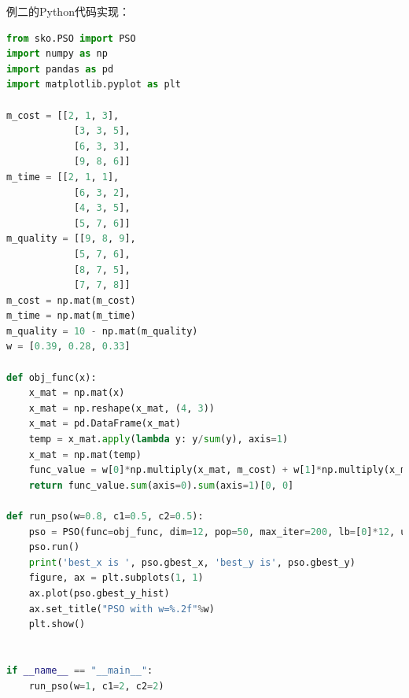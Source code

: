 \documentclass[lang=cn,12pt,a4paper,cite=authoryear]{elegantpaper}
\begin{document}
例二的Python代码实现：

\begin{lstlisting}[language=Python]
from sko.PSO import PSO
import numpy as np
import pandas as pd
import matplotlib.pyplot as plt

m_cost = [[2, 1, 3],
			[3, 3, 5],
			[6, 3, 3],
			[9, 8, 6]]
m_time = [[2, 1, 1],
			[6, 3, 2],
			[4, 3, 5],
			[5, 7, 6]]
m_quality = [[9, 8, 9],
			[5, 7, 6],
			[8, 7, 5],
			[7, 7, 8]]
m_cost = np.mat(m_cost)
m_time = np.mat(m_time)
m_quality = 10 - np.mat(m_quality)
w = [0.39, 0.28, 0.33]

def obj_func(x):
	x_mat = np.mat(x)
	x_mat = np.reshape(x_mat, (4, 3))
	x_mat = pd.DataFrame(x_mat)
	temp = x_mat.apply(lambda y: y/sum(y), axis=1)
	x_mat = np.mat(temp)
	func_value = w[0]*np.multiply(x_mat, m_cost) + w[1]*np.multiply(x_mat, m_time) + w[2]*np.multiply(x_mat, m_quality)
	return func_value.sum(axis=0).sum(axis=1)[0, 0]

def run_pso(w=0.8, c1=0.5, c2=0.5):
	pso = PSO(func=obj_func, dim=12, pop=50, max_iter=200, lb=[0]*12, ub=[1]*12, w=w, c1=c1, c2=c2)
	pso.run()
	print('best_x is ', pso.gbest_x, 'best_y is', pso.gbest_y)
	figure, ax = plt.subplots(1, 1)
	ax.plot(pso.gbest_y_hist)
	ax.set_title("PSO with w=%.2f"%w)
	plt.show()


if __name__ == "__main__":
	run_pso(w=1, c1=2, c2=2)
\end{lstlisting}
\end{document}

